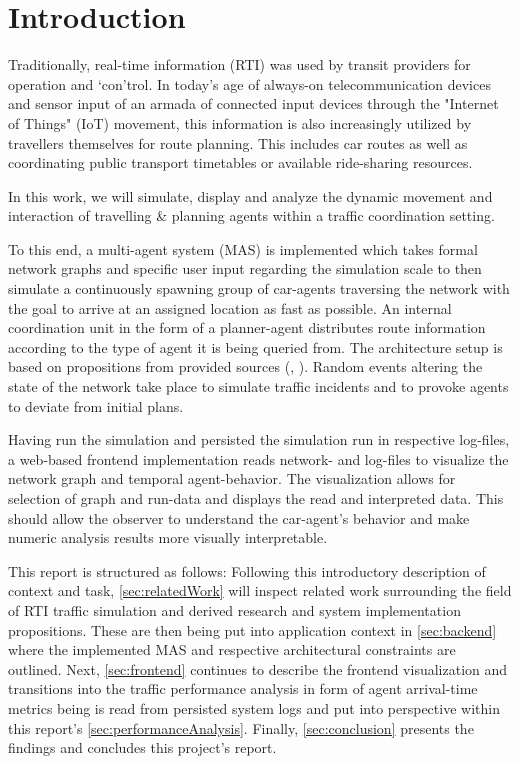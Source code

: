 \section{Introduction}

Traditionally, real-time information (RTI) was used by transit providers for operation and `con'trol.
In today's age of always-on telecommunication devices and sensor input of an armada of connected input devices through the "Internet of Things" (IoT) movement, this information is also increasingly utilized by travellers themselves for route planning. This includes car routes as well as coordinating public transport timetables or available ride-sharing resources.

In this work, we will simulate, display and analyze the dynamic movement and interaction of travelling \& planning agents within a traffic coordination setting.

To this end, a multi-agent system (MAS) is implemented which takes formal network graphs and specific user input regarding the simulation scale to then simulate a continuously spawning group of car-agents traversing the network with the goal to arrive at an assigned location as fast as possible.
An internal coordination unit in the form of a planner-agent distributes route information according to the type of agent it is being queried from.
The architecture setup is based on propositions from provided sources (\cite{mastio2015towards}, \cite{brakewood2018literature}).
Random events altering the state of the network take place to simulate traffic incidents and to provoke agents to deviate from initial plans.

Having run the simulation and persisted the simulation run in respective log-files, a web-based frontend implementation reads network- and log-files to visualize the network graph and temporal agent-behavior. The visualization allows for selection of graph and run-data and displays the read and interpreted data.
This should allow the observer to understand the car-agent's behavior and make numeric analysis results more visually interpretable.

This report is structured as follows:
Following this introductory description of context and task, \autoref{sec:relatedWork} will inspect related work surrounding the field of RTI traffic simulation and derived research and system implementation propositions.
These are then being put into application context in \autoref{sec:backend} where the implemented MAS and respective architectural constraints are outlined.
Next, \autoref{sec:frontend} continues to describe the frontend visualization and transitions into the traffic performance analysis in form of agent arrival-time metrics being is read from persisted system logs and put into perspective within this report's \autoref{sec:performanceAnalysis}.
Finally, \autoref{sec:conclusion} presents the findings and concludes this project's report.    